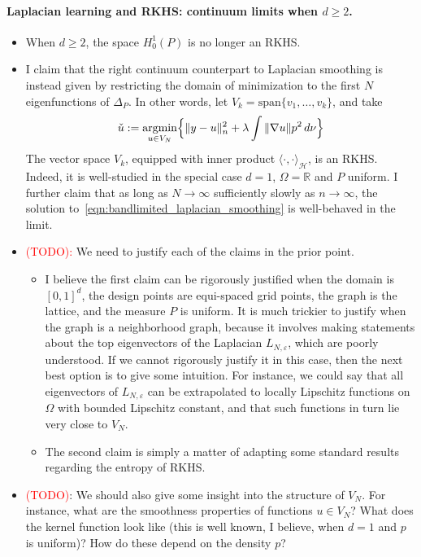 \documentclass{article}
\newcommand{\Reals}{\mathbb{R}}
\newcommand{\1}{\mathbf{1}}
\DeclareMathOperator*{\argmin}{argmin}
\newcommand{\mc}[1]{\mathcal{#1}}
\newcommand{\dotp}[2]{\langle #1, #2 \rangle}
\theoremstyle{definition}
\theoremstyle{remark}
\begin{document}
\paragraph{Laplacian learning and RKHS: continuum limits when $d \geq 2$.}
\begin{itemize}
	\item When $d \geq 2$, the space $H_0^1(P)$ is no longer an RKHS.
	\item I claim that the right continuum counterpart to Laplacian smoothing is instead given by restricting the domain of minimization to the first $N$ eigenfunctions of $\Delta_P$. In other words, let $V_k = \mathrm{span}\{v_1,\ldots,v_k\}$, and take
	\begin{equation}
	\label{eqn:bandlimited_laplacian_smoothing}
	\check{u} := \argmin_{u \in V_N} \Bigl\{ \|y - u\|_n^2 + \lambda \int \|\nabla u\| p^2 \,d \nu  \Bigr\}
	\end{equation}
	The vector space $V_k$, equipped with inner product $\dotp{\cdot}{\cdot}_{\mc{H}}$, is an RKHS. Indeed, it is well-studied in the special case $d = 1$, $\Omega = \Reals$ and $P$ uniform. I further claim that as long as $N \to \infty$ sufficiently slowly as $n \to \infty$, the solution to~\eqref{eqn:bandlimited_laplacian_smoothing} is well-behaved in the limit.
	\item \textcolor{red}{(TODO):} We need to justify each of the claims in the prior point. 
	\begin{itemize}
		\item I believe the first claim can be rigorously justified when the domain is $[0,1]^d$, the design points are equi-spaced grid points, the graph is the lattice, and the measure $P$ is uniform. It is much trickier to justify when the graph is a neighborhood graph, because it involves making statements about the top eigenvectors of the Laplacian $L_{N,\varepsilon}$, which are poorly understood. If we cannot rigorously justify it in this case, then the next best option is to give some intuition. For instance, we could say that all eigenvectors of $L_{N,\varepsilon}$ can be extrapolated to locally Lipschitz functions on $\Omega$ with bounded Lipschitz constant, and that such functions in turn lie very close to $V_N$.
		\item The second claim is simply a matter of adapting some standard results regarding the entropy of RKHS.
	\end{itemize}
	\item \textcolor{red}{(TODO)}: We should also give some insight into the structure of $V_N$. For instance, what are the smoothness properties of functions $u \in V_N$? What does the kernel function look like (this is well known, I believe, when $d = 1$ and $p$ is uniform)? How do these depend on the density $p$?

\end{itemize}
\end{document}
